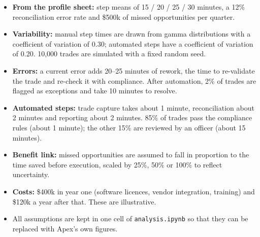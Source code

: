 \documentclass[11pt]{article}
\let\oldheading\heading
\renewcommand{\heading}[1]{\Needspace{8\baselineskip}\oldheading{#1}}
\begin{document}
\begin{itemize}[leftmargin=1.5em, itemsep=3pt]
  \item \textbf{From the profile sheet:} step means of 15 / 20 / 25 / 30
  minutes, a 12\% reconciliation error rate and \$500k of missed opportunities
  per quarter.
  \item \textbf{Variability:} manual step times are drawn from gamma
  distributions with a coefficient of variation of 0.30; automated steps have
  a coefficient of variation of 0.20. 10,000 trades are simulated with a fixed
  random seed.
  \item \textbf{Errors:} a current error adds 20--25 minutes of rework, the
  time to re-validate the trade and re-check it with compliance. After
  automation, 2\% of trades are flagged as exceptions and take 10 minutes to
  resolve.
  \item \textbf{Automated steps:} trade capture takes about 1 minute,
  reconciliation about 2 minutes and reporting about 2 minutes. 85\% of
  trades pass the compliance rules (about 1 minute); the other 15\% are
  reviewed by an officer (about 15 minutes).
  \item \textbf{Benefit link:} missed opportunities are assumed to fall in
  proportion to the time saved before execution, scaled by 25\%, 50\% or
  100\% to reflect uncertainty.
  \item \textbf{Costs:} \$400k in year one (software licences, vendor
  integration, training) and \$120k a year after that. These are
  illustrative.
  \item All assumptions are kept in one cell of \texttt{analysis.ipynb} so
  that they can be replaced with Apex's own figures.
\end{itemize}
\end{document}
